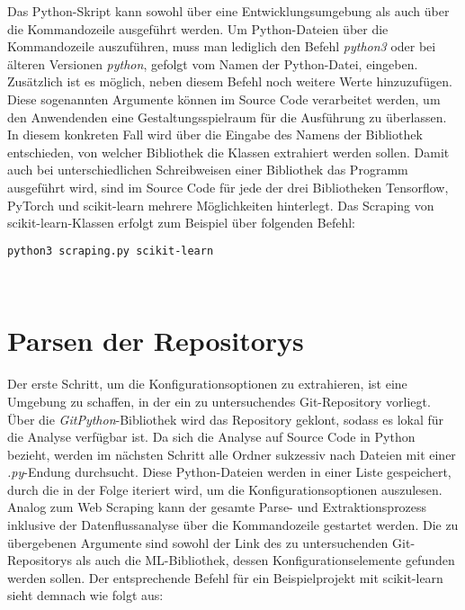 \documentclass[german,bachelor]{swsLeipzig}
\begin{document}
\noindent Das Python-Skript kann sowohl über eine Entwicklungsumgebung als auch über die Kommandozeile ausgeführt werden.
Um Python-Dateien über die Kommandozeile auszuführen, muss man lediglich den Befehl \textit{python3} oder bei älteren
Versionen \textit{python}, gefolgt vom Namen der Python-Datei, eingeben.
Zusätzlich ist es möglich, neben diesem Befehl noch weitere Werte hinzuzufügen.
Diese sogenannten Argumente können im Source Code verarbeitet werden, um den Anwendenden eine Gestaltungsspielraum für
die Ausführung zu überlassen.
In diesem konkreten Fall wird über die Eingabe des Namens der Bibliothek entschieden, von welcher Bibliothek die
Klassen extrahiert werden sollen.
Damit auch bei unterschiedlichen Schreibweisen einer Bibliothek das Programm ausgeführt wird, sind im Source Code für jede
der drei Bibliotheken Tensorflow, PyTorch und scikit-learn mehrere Möglichkeiten hinterlegt.
Das Scraping von scikit-learn-Klassen erfolgt zum Beispiel über folgenden Befehl:\\

\noindent\begin{minipage}{\linewidth}
\begin{lstlisting}[language=bash, frame=single, label=scraping_scikit-learn, basicstyle=\small, caption={Kommandozeilenbefehl für das Web Scraping von scikit-learn},captionpos=b]
python3 scraping.py scikit-learn
\end{lstlisting}
\end{minipage}
\

\section{Parsen der Repositorys}
Der erste Schritt, um die Konfigurationsoptionen zu extrahieren, ist eine Umgebung zu schaffen, in der ein zu untersuchendes
Git-Repository vorliegt.
Über die \textit{GitPython}-Bibliothek wird das Repository geklont, sodass es lokal für die Analyse verfügbar ist.
Da sich die Analyse auf Source Code in Python bezieht, werden im nächsten Schritt alle Ordner sukzessiv nach Dateien mit
einer \textit{.py}-Endung durchsucht.
Diese Python-Dateien werden in einer Liste gespeichert, durch die in der Folge iteriert wird, um die Konfigurationsoptionen auszulesen. \\
\noindent Analog zum Web Scraping kann der gesamte Parse- und Extraktionsprozess inklusive der Datenflussanalyse über die Kommandozeile gestartet werden.
Die zu übergebenen Argumente sind sowohl der Link des zu untersuchenden Git-Repositorys als auch die ML-Bibliothek, dessen
Konfigurationselemente gefunden werden sollen.
Der entsprechende Befehl für ein Beispielprojekt mit scikit-learn sieht demnach wie folgt aus: \\
\end{document}
